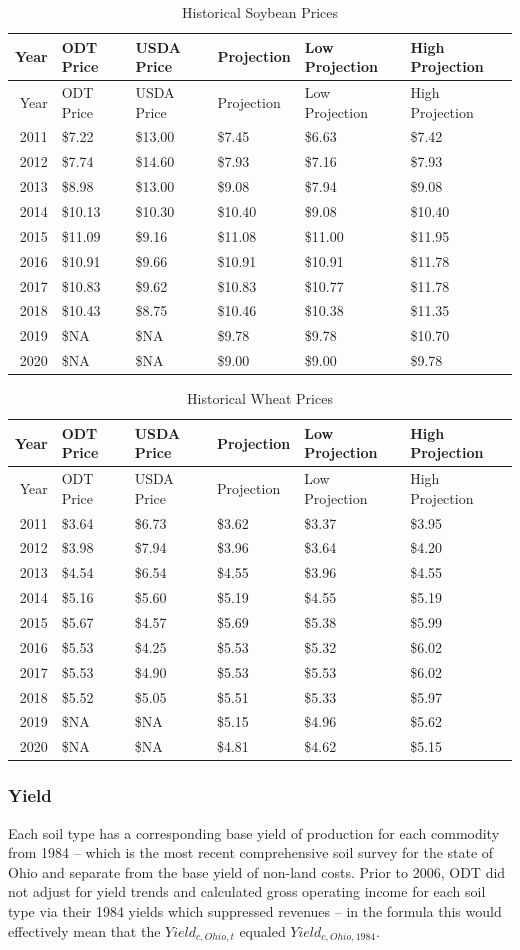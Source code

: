 \documentclass[]{article}
\begin{document}
\begin{longtable}[]{@{}rlllll@{}}
\caption{Historical Soybean Prices}\tabularnewline
\toprule
Year & ODT Price & USDA Price & Projection & Low Projection & High
Projection\tabularnewline
\midrule
\endfirsthead
\toprule
Year & ODT Price & USDA Price & Projection & Low Projection & High
Projection\tabularnewline
\midrule
\endhead
2011 & \$7.22 & \$13.00 & \$7.45 & \$6.63 & \$7.42\tabularnewline
2012 & \$7.74 & \$14.60 & \$7.93 & \$7.16 & \$7.93\tabularnewline
2013 & \$8.98 & \$13.00 & \$9.08 & \$7.94 & \$9.08\tabularnewline
2014 & \$10.13 & \$10.30 & \$10.40 & \$9.08 & \$10.40\tabularnewline
2015 & \$11.09 & \$9.16 & \$11.08 & \$11.00 & \$11.95\tabularnewline
2016 & \$10.91 & \$9.66 & \$10.91 & \$10.91 & \$11.78\tabularnewline
2017 & \$10.83 & \$9.62 & \$10.83 & \$10.77 & \$11.78\tabularnewline
2018 & \$10.43 & \$8.75 & \$10.46 & \$10.38 & \$11.35\tabularnewline
2019 & \$NA & \$NA & \$9.78 & \$9.78 & \$10.70\tabularnewline
2020 & \$NA & \$NA & \$9.00 & \$9.00 & \$9.78\tabularnewline
\bottomrule
\end{longtable}

\begin{longtable}[]{@{}rlllll@{}}
\caption{Historical Wheat Prices}\tabularnewline
\toprule
Year & ODT Price & USDA Price & Projection & Low Projection & High
Projection\tabularnewline
\midrule
\endfirsthead
\toprule
Year & ODT Price & USDA Price & Projection & Low Projection & High
Projection\tabularnewline
\midrule
\endhead
2011 & \$3.64 & \$6.73 & \$3.62 & \$3.37 & \$3.95\tabularnewline
2012 & \$3.98 & \$7.94 & \$3.96 & \$3.64 & \$4.20\tabularnewline
2013 & \$4.54 & \$6.54 & \$4.55 & \$3.96 & \$4.55\tabularnewline
2014 & \$5.16 & \$5.60 & \$5.19 & \$4.55 & \$5.19\tabularnewline
2015 & \$5.67 & \$4.57 & \$5.69 & \$5.38 & \$5.99\tabularnewline
2016 & \$5.53 & \$4.25 & \$5.53 & \$5.32 & \$6.02\tabularnewline
2017 & \$5.53 & \$4.90 & \$5.53 & \$5.53 & \$6.02\tabularnewline
2018 & \$5.52 & \$5.05 & \$5.51 & \$5.33 & \$5.97\tabularnewline
2019 & \$NA & \$NA & \$5.15 & \$4.96 & \$5.62\tabularnewline
2020 & \$NA & \$NA & \$4.81 & \$4.62 & \$5.15\tabularnewline
\bottomrule
\end{longtable}

\hypertarget{yield}{%
\subsubsection{Yield}\label{yield}}

Each soil type has a corresponding base yield of production for each
commodity from 1984 -- which is the most recent comprehensive soil
survey for the state of Ohio and separate from the base yield of
non-land costs. Prior to 2006, ODT did not adjust for yield trends and
calculated gross operating income for each soil type via their 1984
yields which suppressed revenues -- in the formula this would
effectively mean that the \(Yield_{c,Ohio,t}\) equaled
\(Yield_{c,Ohio,1984}\).
\end{document}
